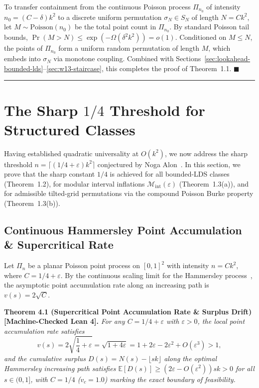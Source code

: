 \documentclass[
  11pt,
]{article}
\begin{document}
To transfer containment from the continuous Poisson process \(\Pi_{n_0}\) of intensity \(n_0 = (C - \delta) k^2\) to a discrete uniform permutation \(\sigma_N \in S_N\) of length \(N = C k^2\), let \(M \sim \mathrm{Poisson}(n_0)\) be the total point count in \(\Pi_{n_0}\). By standard Poisson tail bounds, \(\Pr(M > N) \le \exp(-\Omega(\delta^2 k^2)) = o(1)\). Conditioned on \(M \le N\), the points of \(\Pi_{n_0}\) form a uniform random permutation of length \(M\), which embeds into \(\sigma_N\) via monotone coupling. Combined with Sections~\ref{sec:lookahead-bounded-lds}--\ref{sec:w13-staircase}, this completes the proof of Theorem~1.1. \(\blacksquare\)

\begin{center}\rule{0.5\linewidth}{0.5pt}\end{center}

\section{\texorpdfstring{The Sharp \(1/4\) Threshold for Structured Classes}{The Sharp 1/4 Threshold for Structured Classes}}\label{sec:structured-classes}

Having established quadratic universality at \(O(k^2)\), we now address the sharp threshold \(n = \lceil(1/4+\varepsilon)k^2\rceil\) conjectured by Noga Alon~\cite{ref-HK20}. In this section, we prove that the sharp constant \(1/4\) is achieved for all bounded-LDS classes (Theorem~1.2), for modular interval inflations \(\mathcal{M}_{\mathrm{int}}(\varepsilon)\) (Theorem~1.3(a)), and for admissible tilted-grid permutations via the compound Poisson Burke property (Theorem~1.3(b)).

\subsection{Continuous Hammersley Point Accumulation \& Supercritical
Rate}\label{continuous-hammersley-point-accumulation-supercritical-rate}

Let \(\Pi_n\) be a planar Poisson point process on \([0, 1]^2\) with intensity \(n = C k^2\), where \(C = 1/4 + \varepsilon\). By the continuous scaling limit for the Hammersley process~\cite{ref-LS77, ref-VK77, ref-AD95}, the asymptotic point accumulation rate along an increasing path is \(v(s) = 2 \sqrt{C}\).

\textbf{Theorem 4.1 (Supercritical Point Accumulation Rate \& Surplus Drift) [Machine-Checked Lean 4].} \emph{For any \(C = 1/4 + \varepsilon\) with \(\varepsilon > 0\), the local point accumulation rate satisfies}
\[
v(s) = 2\sqrt{\frac{1}{4} + \varepsilon} = \sqrt{1 + 4\varepsilon} = 1 + 2\varepsilon - 2\varepsilon^2 + O(\varepsilon^3) > 1,
\]
\emph{and the cumulative surplus \(D(s) = N(s) - \lfloor s k \rfloor\) along the optimal Hammersley increasing path satisfies \(\mathbb{E}[D(s)] \ge (2\varepsilon - O(\varepsilon^2)) s k > 0\) for all \(s \in (0, 1]\), with \(C = 1/4\) (\(v_c = 1.0\)) marking the exact boundary of feasibility.}
\end{document}
